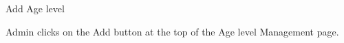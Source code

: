
\begin{uc}{Add Age level}

    
    \begin{uc-trig}
        Admin clicks on the Add button at the top of the Age level Management
        page.
    \end{uc-trig}
\end{uc}

